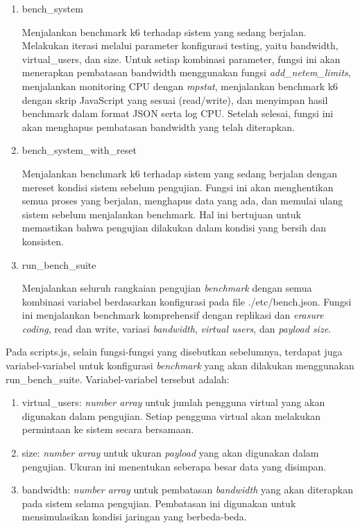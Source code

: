 \begin{enumerate}
	\item bench\_system

	      Menjalankan benchmark k6 terhadap sistem yang sedang berjalan. Melakukan iterasi melalui parameter konfigurasi testing, yaitu bandwidth, virtual\_users, dan size. Untuk setiap kombinasi parameter, fungsi ini akan menerapkan pembatasan bandwidth menggunakan fungsi \textit{add\_netem\_limits}, menjalankan monitoring CPU dengan \textit{mpstat}, menjalankan benchmark k6 dengan skrip JavaScript yang sesuai (read/write), dan menyimpan hasil benchmark dalam format JSON serta log CPU. Setelah selesai, fungsi ini akan menghapus pembatasan bandwidth yang telah diterapkan.

	\item bench\_system\_with\_reset

	      Menjalankan benchmark k6 terhadap sistem yang sedang berjalan dengan mereset kondisi sistem sebelum pengujian. Fungsi ini akan menghentikan semua proses yang berjalan, menghapus data yang ada, dan memulai ulang sistem sebelum menjalankan benchmark. Hal ini bertujuan untuk memastikan bahwa pengujian dilakukan dalam kondisi yang bersih dan konsisten.

	\item run\_bench\_suite

	      Menjalankan seluruh rangkaian pengujian \textit{benchmark} dengan semua kombinasi variabel berdasarkan konfigurasi pada file ./etc/bench.json. Fungsi ini menjalankan benchmark komprehensif dengan replikasi dan \textit{erasure coding}, read dan write, variasi \textit{bandwidth}, \textit{virtual users}, dan \textit{payload size}.
\end{enumerate}

Pada scripts.js, selain fungsi-fungsi yang disebutkan sebelumnya, terdapat juga variabel-variabel untuk konfigurasi \textit{benchmark} yang akan dilakukan menggunakan run\_bench\_suite. Variabel-variabel tersebut adalah:

\begin{enumerate}
	\item virtual\_users: \textit{number array} untuk jumlah pengguna virtual yang akan digunakan dalam pengujian. Setiap pengguna virtual akan melakukan permintaan ke sistem secara bersamaan.
	\item size: \textit{number array} untuk ukuran \textit{payload} yang akan digunakan dalam pengujian. Ukuran ini menentukan seberapa besar data yang disimpan.
	\item bandwidth: \textit{number array} untuk pembatasan \textit{bandwidth} yang akan diterapkan pada sistem selama pengujian. Pembatasan ini digunakan untuk mensimulasikan kondisi jaringan yang berbeda-beda.
\end{enumerate}

